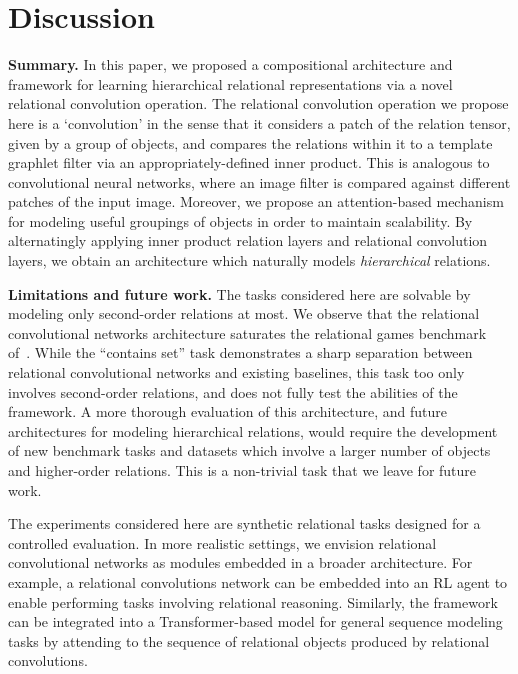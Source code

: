 
\section{Discussion}\label{sec:discussion}

\textbf{Summary.} In this paper, we proposed a compositional architecture and framework for learning hierarchical relational representations via a novel relational convolution operation. The relational convolution operation we propose here is a `convolution' in the sense that it considers a patch of the relation tensor, given by a group of objects, and compares the relations within it to a template graphlet filter via an appropriately-defined inner product. This is analogous to convolutional neural networks, where an image filter is compared against different patches of the input image. Moreover, we propose an attention-based mechanism for modeling useful groupings of objects in order to maintain scalability. By alternatingly applying inner product relation layers and relational convolution layers, we obtain an architecture which naturally models \textit{hierarchical} relations.


\textbf{Limitations and future work.} The tasks considered here are solvable by modeling only second-order relations at most. We observe that the relational convolutional networks architecture saturates the relational games benchmark of~\citep{shanahanExplicitlyRelationalNeural}. While the ``contains set'' task demonstrates a sharp separation between relational convolutional networks and existing baselines, this task too only involves second-order relations, and does not fully test the abilities of the framework. A more thorough evaluation of this architecture, and future architectures for modeling hierarchical relations, would require the development of new benchmark tasks and datasets which involve a larger number of objects and higher-order relations. This is a non-trivial task that we leave for future work.

The experiments considered here are synthetic relational tasks designed for a controlled evaluation. In more realistic settings, we envision relational convolutional networks as modules embedded in a broader architecture. For example, a relational convolutions network can be embedded into an RL agent to enable performing tasks involving relational reasoning. Similarly, the framework can be integrated into a Transformer-based model for general sequence modeling tasks by attending to the sequence of relational objects produced by relational convolutions.